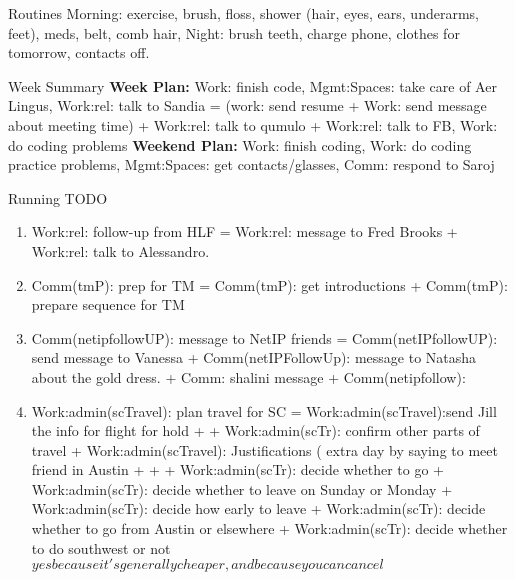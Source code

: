 \begin{frame}
\begin{columns}
\begin{column}{0.50\linewidth}
      \begin{block}{Routines}
        Morning: exercise, brush, floss, shower (hair, eyes, ears,
        underarms, feet), meds,  belt, comb hair, Night: brush teeth, charge
        phone, clothes for tomorrow, contacts off.  
      \end{block}
      
      \begin{block}{Week Summary}
        {\tiny \textbf{Week Plan:} Work: finish code, Mgmt:Spaces:
          take care of Aer Lingus, Work:rel: talk to Sandia = (work:
          send resume + Work: send message about meeting time)  +
          Work:rel: talk to qumulo + Work:rel: talk to FB, Work: do
          coding problems  } 
        {\tiny \textbf{Weekend Plan:} Work: finish coding, Work: do 
          coding practice problems, Mgmt:Spaces: get contacts/glasses,
          Comm: respond to Saroj } 

      \end{block}

      \begin{block}{Running TODO} %
        \begin{enumerate}
        \item \small Work:rel: follow-up from HLF = Work:rel: message to
          Fred Brooks + Work:rel: talk to Alessandro. 
        \item \tiny Comm(tmP): prep for TM   = Comm(tmP): get
          introductions  + Comm(tmP): prepare sequence
          for TM 

        \item \tiny Comm(netipfollowUP): message to NetIP friends  = 
          Comm(netIPfollowUP): send message to Vanessa  + Comm(netIPFollowUp): message to Natasha about
          the gold dress. + Comm: shalini message + Comm(netipfollow): 
             

        \item \tiny Work:admin(scTravel): plan travel for SC =
          Work:admin(scTravel):send Jill the info for flight for hold
           +  + Work:admin(scTr): confirm other parts of
          travel + Work:admin(scTravel): Justifications ( extra day by saying
          to meet friend in Austin +
           +
           +  Work:admin(scTr): decide whether to go + 
          Work:admin(scTr): decide whether to leave on Sunday or
          Monday +
          Work:admin(scTr): decide how early to leave + 
         Work:admin(scTr): decide whether to go from Austin or
          elsewhere 
          + Work:admin(scTr): decide whether to do southwest or not
          $yes because it's generally cheaper, and because you can
          cancel$ 


\end{enumerate}
\end{block}
\end{column}
\end{columns}
\end{frame}
